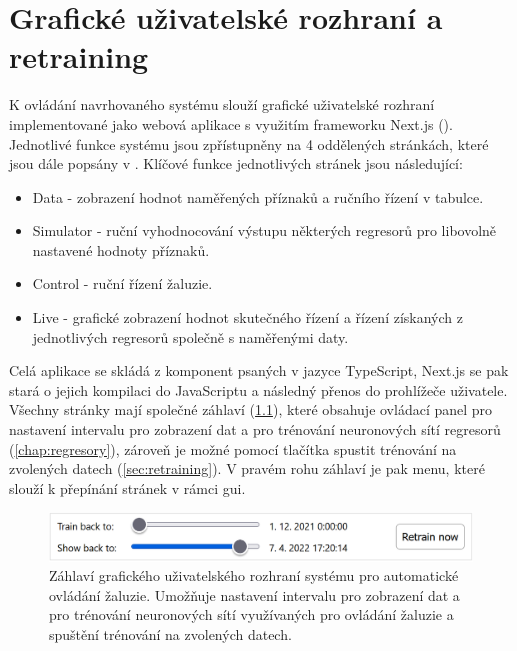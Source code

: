 \chapter{Grafické uživatelské rozhraní a retraining} \label{chap:gui}
    K ovládání navrhovaného systému slouží grafické uživatelské rozhraní implementované jako webová aplikace s využitím frameworku Next.js (\cite{vercel:nextjs}). Jednotlivé funkce systému jsou zpřístupněny na 4 oddělených stránkách, které jsou dále popsány v . Klíčové funkce jednotlivých stránek jsou následující:
    \begin{itemize}
        \item Data - zobrazení hodnot naměřených příznaků a ručního řízení v tabulce.
        \item Simulator - ruční vyhodnocování výstupu některých regresorů pro libovolně nastavené hodnoty příznaků.
        \item Control - ruční řízení žaluzie.
        \item Live - grafické zobrazení hodnot skutečného řízení a řízení získaných z jednotlivých regresorů společně s naměřenými daty.
    \end{itemize}

    Celá aplikace se skládá z komponent psaných v jazyce TypeScript, Next.js se pak stará o jejich kompilaci do JavaScriptu a následný přenos do prohlížeče uživatele. Všechny stránky mají společné záhlaví (\cref{fig:zahlavi}), které obsahuje ovládací panel pro nastavení intervalu pro zobrazení dat a pro trénování neuronových sítí regresorů (\cref{chap:regresory}), zároveň je možné pomocí tlačítka spustit trénování na zvolených datech (\cref{sec:retraining}). V pravém rohu záhlaví je pak menu, které slouží k přepínání stránek v rámci \acrshort{gui}.
    \begin{figure}
        \centering
        \includegraphics[draft=\draftfig,width=\textwidth]{img/gui/zahlavi.png}
        \caption[Záhlaví GUI]{Záhlaví grafického uživatelského rozhraní systému pro automatické ovládání žaluzie. Umožňuje nastavení intervalu pro zobrazení dat a pro trénování neuronových sítí využívaných pro ovládání žaluzie a spuštění trénování na zvolených datech.}
        \label{fig:zahlavi}
    \end{figure}
